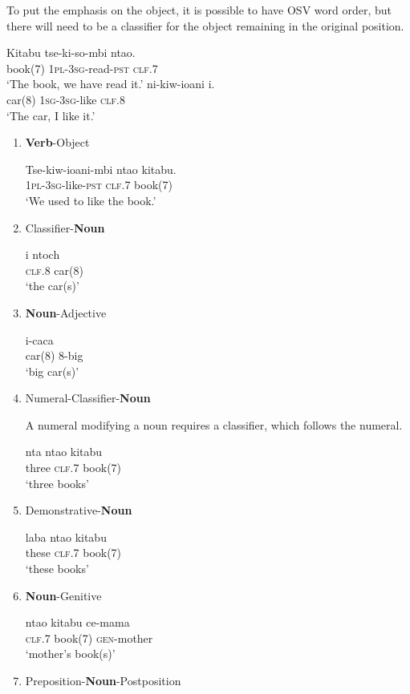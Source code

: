 To put the emphasis on the object, it is possible to have OSV word order, but there will need to be a classifier for the object remaining in the original position.

\begin{exe}
\ex
\gll Kitabu tse-ki-so-mbi nta\textbeltl o. \\
book(7) \textsc{1pl}-\textsc{3sg}-read-\textsc{pst} \textsc{clf}.7 \\
\trans `The book, we have read it.'
\ex
{} ni-kiw-ioani i. \\
car(8) \textsc{1sg}-\textsc{3sg}-like \textsc{clf}.8 \\
\trans `The car, I like it.'
\end{exe}



\begin{enumerate}
\item \textbf{Verb}-Object
\begin{exe}
\ex
\gll Tse-kiw-ioani-mbi nta\textbeltl o kitabu. \\
\textsc{1pl}-\textsc{3sg}-like-\textsc{pst} \textsc{clf}.7 book(7) \\
\trans `We used to like the book.'
\end{exe}
\item Classifier-\textbf{Noun}
\begin{exe}
\ex
\gll i {ntoch\textramshorns} \\
\textsc{clf.8} car(8) \\
\trans `the car(s)'
\end{exe}
\item \textbf{Noun}-Adjective
\begin{exe}
\ex
{} i-caca \\
car(8) 8-big \\
\trans `big car(s)'
\end{exe}
\item Numeral-Classifier-\textbf{Noun}

A numeral modifying a noun requires a classifier, which follows the numeral.
\begin{exe}
\ex
\gll nta nta\textbeltl o kitabu \\
three \textsc{clf.7} book(7) \\
\trans `three books'
\end{exe}
\item Demonstrative-\textbf{Noun}
\begin{exe}
\ex
\gll laba nta\textbeltl o kitabu \\
these \textsc{clf.7} book(7) \\
\trans `these books'
\end{exe}
\item \textbf{Noun}-Genitive
\begin{exe}
\ex
\gll nta\textbeltl o kitabu ce-mama \\
\textsc{clf.7} book(7) \textsc{gen}-mother \\
\trans `mother's book(s)'
\end{exe}
\item Preposition-\textbf{Noun}-Postposition


\end{enumerate}
